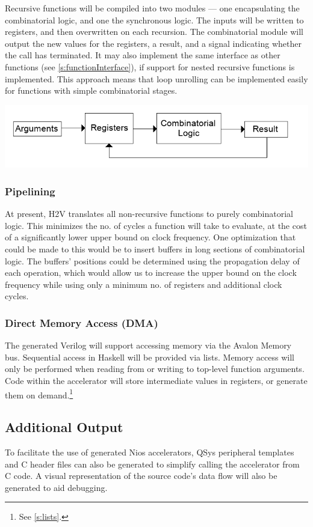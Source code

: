 \documentclass[english,onecolumn]{article}
\begin{document}
Recursive functions will be compiled into two modules --- one encapsulating the combinatorial logic, and one the synchronous logic.
The inputs will be written to registers, and then overwritten on each recursion. The combinatorial module will output the new values for the registers, a result, and a signal indicating whether the call has terminated. It may also implement the same interface as other functions (see \ref{s:functionInterface}), if support for nested recursive functions is implemented.
This approach means that loop unrolling can be implemented easily for functions with simple combinatorial stages.

\includegraphics[scale=0.5]{./recursive.png}

\subsubsection{Pipelining}
At present, H2V translates all non-recursive functions to purely combinatorial logic. This minimizes the no. of cycles a function will take to evaluate, at the cost of a significantly lower upper bound on clock frequency. One optimization that could be made to this would be to insert buffers in long sections of combinatorial logic. The buffers' positions could be determined using the propagation delay of each operation, which would allow us to increase the upper bound on the clock frequency while using only a minimum no. of registers and additional clock cycles.

\subsubsection{Direct Memory Access (DMA)}
\label{s:DMA}
The generated Verilog will support accessing memory via the Avalon Memory bus. Sequential access in Haskell will be provided via lists.
Memory access will only be performed when reading from or writing to top-level function arguments. Code within the accelerator will store intermediate values in registers, or generate them on demand.\footnote{See \ref{s:lists}.}

\subsection{Additional Output}
To facilitate the use of generated Nios accelerators, QSys peripheral templates and C header files can also be generated to simplify calling the accelerator from C code.
A visual representation of the source code's data flow will also be generated to aid debugging.
\end{document}
